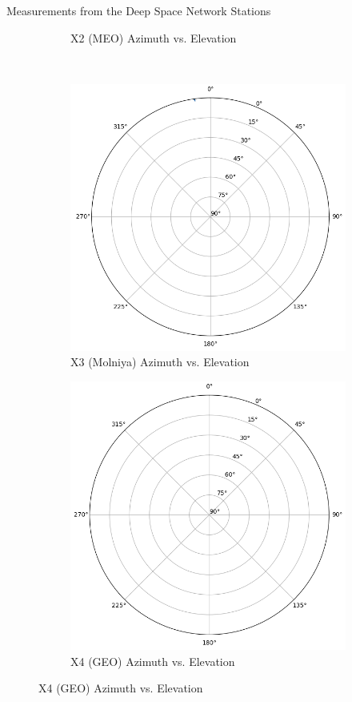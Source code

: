 \begin{hwkProblem}{4}{Measurements from the Deep Space Network Stations}
\begin{figure}[H]
\begin{center}
\begin{subfigure}{0.4\textwidth}
				\caption{X2 (MEO) Azimuth vs. Elevation}
			\end{subfigure}
			\\
			\begin{subfigure}{0.4\textwidth} \label{fig:s04a3}
				\includegraphics[width=\linewidth]{./images/s04a3.png}
				\caption{X3 (Molniya) Azimuth vs. Elevation}
			\end{subfigure}
			\begin{subfigure}{0.4\textwidth} \label{fig:s04a4}
				\includegraphics[width=\linewidth]{./images/s04a4.png}
				\caption{X4 (GEO) Azimuth vs. Elevation}
			\end{subfigure}
		\end{center}
	\end{figure}


\end{hwkProblem}
